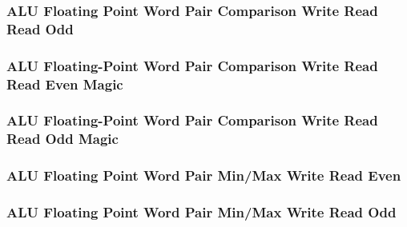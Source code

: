 

\subsubsection[{\small ALU Floating Point Word Pair Comparison Write Read Read Odd}]{ALU Floating Point Word Pair Comparison Write Read Read Odd} \label{sec:format-ALU-FWPCWRRO}



\subsubsection[{\small ALU Floating-Point Word Pair Comparison Write Read Read Even Magic}]{ALU Floating-Point Word Pair Comparison Write Read Read Even Magic} \label{sec:format-ALU-FWPCWRRE.M}



\subsubsection[{\small ALU Floating-Point Word Pair Comparison Write Read Read Odd Magic}]{ALU Floating-Point Word Pair Comparison Write Read Read Odd Magic} \label{sec:format-ALU-FWPCWRRO.M}



\subsubsection[{\small ALU Floating Point Word Pair Min/Max Write Read Even}]{ALU Floating Point Word Pair Min/Max Write Read Even} \label{sec:format-ALU-FWPMMWRE}



\subsubsection[{\small ALU Floating Point Word Pair Min/Max Write Read Odd}]{ALU Floating Point Word Pair Min/Max Write Read Odd} \label{sec:format-ALU-FWPMMWRO}

